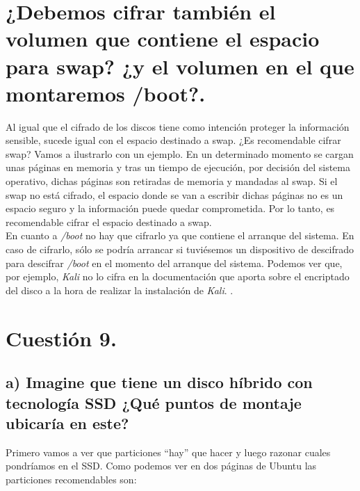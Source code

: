 \documentclass[a4paper,titlepage,12pt]{scrartcl}	%
\numberwithin{figure}{section} %
\numberwithin{table}{section} %
\begin{document}
	\section[¿Debemos cifrar también el volumen que contiene el espacio para swap? ¿y el volumen en el que montaremos /boot?.]{¿Debemos cifrar también el volumen que contiene el espacio para swap? ¿y el volumen en el que montaremos /boot?.}
	
	Al igual que el cifrado de los discos tiene como intención proteger la información sensible, sucede igual con el espacio destinado a swap. ¿Es recomendable cifrar swap? Vamos a ilustrarlo con un ejemplo. En un determinado momento se cargan unas páginas en memoria y tras un tiempo de ejecución, por decisión del sistema operativo, dichas páginas son retiradas de memoria y mandadas al swap. Si el swap no está cifrado, el espacio donde se van a escribir dichas páginas no es un espacio seguro y la información puede quedar comprometida. Por lo tanto, es recomendable cifrar el espacio destinado a swap. \cite{swap} \cite{swap2} \\	
	
	En cuanto a \textit{/boot} no hay que cifrarlo ya que contiene el arranque del sistema. En caso de cifrarlo, sólo se podría arrancar si tuviésemos un dispositivo de descifrado para descifrar \textit{/boot} en el momento del arranque del sistema. Podemos ver que, por ejemplo, \textit{Kali} no lo cifra en la documentación que aporta sobre el encriptado del disco a la hora de realizar la instalación de \textit{Kali}. \cite{boot} \cite{boot2}.
	
	\section[Cuestión 9.]{Cuestión 9.}
	
	\subsection[a) Imagine que tiene un disco híbrido con tecnología SSD ¿Qué puntos de montaje ubicaría en este?]{a) Imagine que tiene un disco híbrido con tecnología SSD ¿Qué puntos de montaje ubicaría en este?}
	Primero vamos a ver que particiones ``hay'' que hacer y luego razonar cuales pondríamos en el SSD. Como podemos ver en dos páginas de Ubuntu \cite{ssd} \cite{ssd2} las particiones recomendables son:
	
\end{document}
